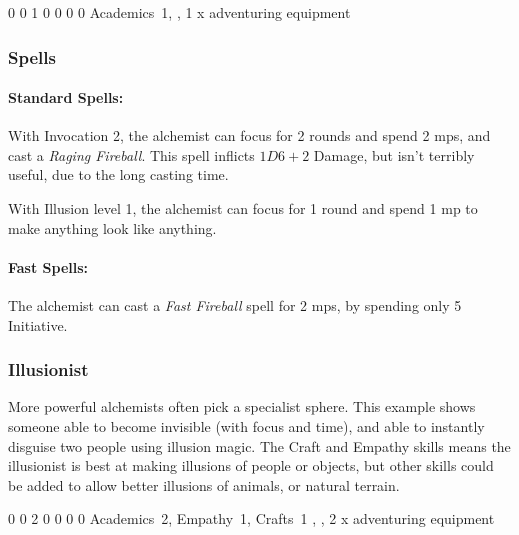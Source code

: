 {\begin{multicols}{2}

{0}%
{0}%
{{1}%
{0}%
{0}}%
{0}%
{0}%
{Academics~1,
}%
{\Dagger, 1 x adventuring equipment}%
{}

\subsubsection{Spells}

\paragraph{Standard Spells:}
With Invocation 2, the alchemist can focus for 2 rounds and spend 2 \glspl{mp}, and cast a \textit{Raging Fireball}.
This spell inflicts $1D6+2$ Damage, but isn't terribly useful, due to the long casting time.

With Illusion level 1, the alchemist can focus for 1 round and spend 1 \gls{mp} to make anything look like anything.

\paragraph{Fast Spells:}
The alchemist can cast a \textit{Fast Fireball} spell for 2 \glspl{mp}, by spending only 5 Initiative.

\subsubsection{Illusionist}

More powerful alchemists often pick a specialist sphere.
This example shows someone able to become invisible (with focus and time), and able to instantly disguise two people using illusion magic.
The Craft and Empathy skills means the illusionist is best at making illusions of people or objects, but other skills could be added to allow better illusions of animals, or natural terrain.


{0}%
{0}%
{{2}%
{0}%
{0}}%
{0}%
{0}%
{Academics~2, Empathy~1, Crafts~1
}%
{\Dagger, \completeleather, 2 x adventuring equipment}%
{}


\end{multicols}}
